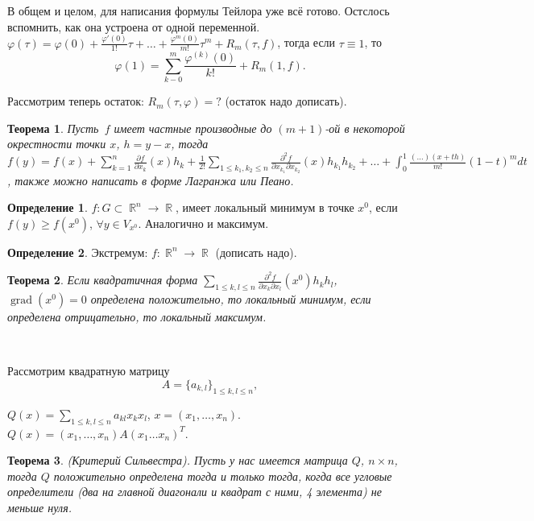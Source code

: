 \documentclass[a4paper,100pt]{article}
\theoremstyle{indented}
\newtheorem{theorem}{Теорема}
\theoremstyle{definition}
\newtheorem{defn}{Определение}
\theoremstyle{remark}
\DeclareMathOperator{\RR}{\mathbb{R}}
\DeclareMathOperator{\grad}{grad}
\begin{document}
В общем и целом, для написания формулы Тейлора уже всё готово. Остслось вспомнить, как она устроена от одной переменной. $\varphi(\tau)=\varphi(0)+\frac{\varphi'(0)}{1!}\tau+\ldots+\frac{\varphi^m(0)}{m!}\tau^m+R_m(\tau, f)$, тогда если $\tau\equiv 1$, то 
\[
    \varphi(1)=\sum_{k-0}^m\frac{\varphi^{(k)}(0)}{k!}+R_m(1, f). 
\]

Рассмотрим теперь остаток: $R_m(\tau, \varphi)=?$ (остаток надо дописать).\\

\begin{theorem}
    Пусть $f$ имеет частные производные до $(m+1)$-ой в некоторой окрестности точки $x$, $h=y-x$, тогда $f(y)=f(x)+\sum_{k=1}^n\frac{\partial f}{\partial x_k}(x)h_k+\frac{1}{2!}\sum_{1\leq k_1, k_2\leq n}\frac{\partial ^2 f}{\partial x_{k_1}\partial x_{k_2}}(x)h_{k_1}h_{k_2}+\ldots+\int_0^1\frac{(\ldots)(x+th)}{m!}(1-t)^m dt$, также можно написать в форме Лагранжа или Пеано.
\end{theorem}

\begin{defn}
    $f:G\subset \RR^n\rightarrow \RR$, имеет локальный минимум в точке $x^0$, если $f(y)\geq f(x^0)$, $\forall y\in V_{x^0}$. Аналогично и максимум.
\end{defn}

\begin{defn}
    Экстремум: $f:\RR^n\rightarrow \RR$ (дописать надо).
\end{defn}

\begin{theorem}
    Если квадратичная форма $\sum_{1\leq k, l\leq n}\frac{\partial^2 f}{\partial x_k \partial x_l}(x^0)h_kh_l$, $\grad (x^0)=0$ определена положительно, то локальный минимум, если определена отрицательно, то локальный максимум.
\end{theorem}\

Рассмотрим квадратную матрицу 
\[
    A = \{a_{k, l}\}_{1\leq k, l \leq n},
\]    
    
$Q(x)=\sum_{1\leq k, l \leq n}a_{k l}x_k x_l$,  $x=(x_1, \ldots, x_n)$. $Q(x)=(x_1, \ldots, x_n)A(x_1\ldots x_n)^T$.\\

\begin{theorem}
    (Критерий Сильвестра). Пусть у нас имеется матрица $Q$, $n\times n$, тогда $Q$ положительно определена тогда и только тогда, когда все угловые определители (два на главной диагонали и квадрат с ними, 4 элемента) не меньше нуля.
\end{theorem}
\end{document}
